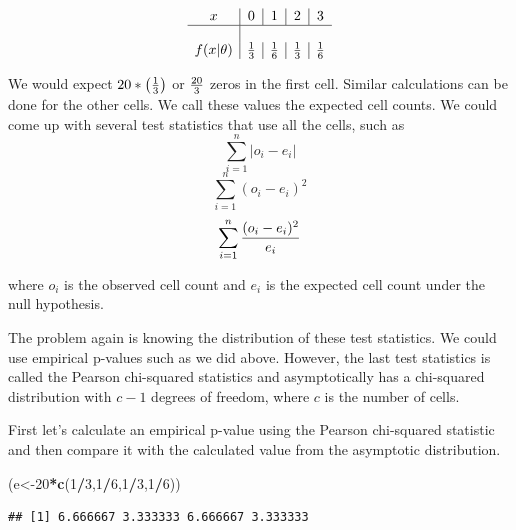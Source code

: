 \documentclass[]{book}
\newenvironment{Shaded}{\begin{snugshade}}{\end{snugshade}}
\newcommand{\KeywordTok}[1]{\textcolor[rgb]{0.13,0.29,0.53}{\textbf{#1}}}
\newcommand{\DecValTok}[1]{\textcolor[rgb]{0.00,0.00,0.81}{#1}}
\newcommand{\OperatorTok}[1]{\textcolor[rgb]{0.81,0.36,0.00}{\textbf{#1}}}
\newcommand{\NormalTok}[1]{#1}
\theoremstyle{definition}
\theoremstyle{definition}
\theoremstyle{definition}
\theoremstyle{remark}
\begin{document}
\[
\begin{array}{c|c|c|c|c} 
x & 0 & 1 & 2 & 3 \\ \hline \\ f(x|\theta) & {1 \over 3} & {1 \over 6} & {1 \over 3} & {1 \over 6}
\end{array} 
\]

We would expect \(20* \left( {1 \over 3} \right)\) or \({20 \over 3}\)
zeros in the first cell. Similar calculations can be done for the other
cells. We call these values the expected cell counts. We could come up
with several test statistics that use all the cells, such as
\[\sum_{i=1}^{n}|o_{i}-e_{i}|\] \[\sum_{i=1}^{n}(o_{i}-e_{i})^{2}\]
\[\sum_{i=1}^{n}{(o_{i}-e_{i})^{2} \over e_{i}}\]

where \(o_{i}\) is the observed cell count and \(e_{i}\) is the expected
cell count under the null hypothesis.

The problem again is knowing the distribution of these test statistics.
We could use empirical p-values such as we did above. However, the last
test statistics is called the Pearson chi-squared statistics and
asymptotically has a chi-squared distribution with \(c-1\) degrees of
freedom, where \(c\) is the number of cells.

First let's calculate an empirical p-value using the Pearson chi-squared
statistic and then compare it with the calculated value from the
asymptotic distribution.

\begin{Shaded}
\begin{Highlighting}[]
\NormalTok{(e<-}\DecValTok{20}\OperatorTok{*}\KeywordTok{c}\NormalTok{(}\DecValTok{1}\OperatorTok{/}\DecValTok{3}\NormalTok{,}\DecValTok{1}\OperatorTok{/}\DecValTok{6}\NormalTok{,}\DecValTok{1}\OperatorTok{/}\DecValTok{3}\NormalTok{,}\DecValTok{1}\OperatorTok{/}\DecValTok{6}\NormalTok{))}
\end{Highlighting}
\end{Shaded}

\begin{verbatim}
## [1] 6.666667 3.333333 6.666667 3.333333
\end{verbatim}
\end{document}
